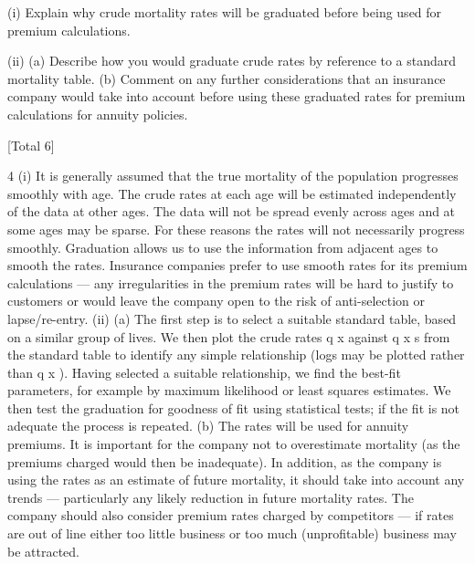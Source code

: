 \documentclass[a4paper,12pt]{article}
\begin{document}
(i) Explain why crude mortality rates will be graduated before being used for
premium calculations.

(ii) (a)
Describe how you would graduate crude rates by reference to a
standard mortality table.
(b)
Comment on any further considerations that an insurance company
would take into account before using these graduated rates for
premium calculations for annuity policies.

[Total 6]

4
(i)
It is generally assumed that the true mortality of the population progresses
smoothly with age.
The crude rates at each age will be estimated independently of the data at other
ages. The data will not be spread evenly across ages and at some ages may be
sparse. For these reasons the rates will not necessarily progress smoothly.
Graduation allows us to use the information from adjacent ages to smooth the
rates.
Insurance companies prefer to use smooth rates for its premium calculations
— any irregularities in the premium rates will be hard to justify to customers
or would leave the company open to the risk of anti-selection or lapse/re-entry.
(ii)
(a)
The first step is to select a suitable standard table, based on a similar
group of lives.
We then plot the crude rates q x against q x s from the standard table to
identify any simple relationship (logs may be plotted rather than q x ).
Having selected a suitable relationship, we find the best-fit parameters,
for example by maximum likelihood or least squares estimates.
We then test the graduation for goodness of fit using statistical tests; if
the fit is not adequate the process is repeated.
(b)
The rates will be used for annuity premiums. It is important for the
company not to overestimate mortality (as the premiums charged
would then be inadequate).
In addition, as the company is using the rates as an estimate of future
mortality, it should take into account any trends — particularly any
likely reduction in future mortality rates.
The company should also consider premium rates charged by
competitors — if rates are out of line either too little business or too
much (unprofitable) business may be attracted.
\end{document}
